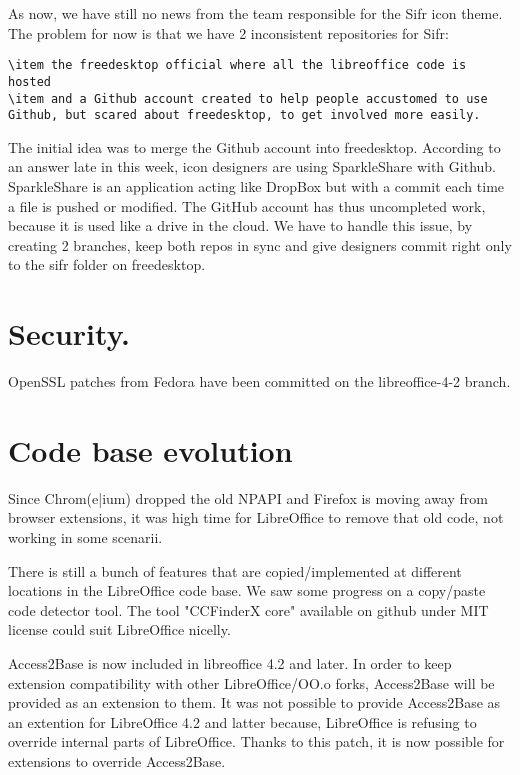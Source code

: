 \documentclass{article}
\begin{document}
As now, we have still no news from the team responsible for the Sifr icon theme. The problem for now is that we have 2 inconsistent repositories for Sifr:
\begin{lstlisting}
\item the freedesktop official where all the libreoffice code is hosted
\item and a Github account created to help people accustomed to use Github, but scared about freedesktop, to get involved more easily.
\end{lstlisting}

The initial idea was to merge the Github account into freedesktop. According to an answer late in this week\cite{sifrGithub1}, icon designers are using SparkleShare with Github. SparkleShare is an application acting like DropBox but with a commit each time a file is pushed or modified. The GitHub account has thus uncompleted work, because it is used like a drive in the cloud. We have to handle this issue, by creating 2 branches, keep both repos in sync and give designers commit right only to the sifr folder on freedesktop.

\section{Security.}

OpenSSL patches from Fedora have been committed on the libreoffice-4-2 branch.

\section{Code base evolution}

Since Chrom(e|ium) dropped the old NPAPI and Firefox is moving away from
browser extensions\cite{npapiMozilla}, it was high time for LibreOffice to remove that
old code, not working in some scenarii\cite{npapiLibONotWorking}.

There is still a bunch of features that are copied/implemented at
different locations in the LibreOffice code base. We saw some progress on a copy/paste code detector tool\cite{copyPasteDetectorBug}. The tool "CCFinderX core" available on github under MIT license could suit LibreOffice nicelly\cite{copyPasteDetectorGithub}.

Access2Base\cite{access2BaseDefinition} is now included in libreoffice 4.2 and later. In order to keep extension compatibility with other LibreOffice/OO.o forks, Access2Base will be provided as an extension to them. It was not possible to provide Access2Base as an extention for LibreOffice 4.2 and latter because, LibreOffice is refusing to override internal parts of LibreOffice. Thanks to this patch\cite{access2BaseOverridePatch}, it is now possible for extensions to override Access2Base.
\end{document}
